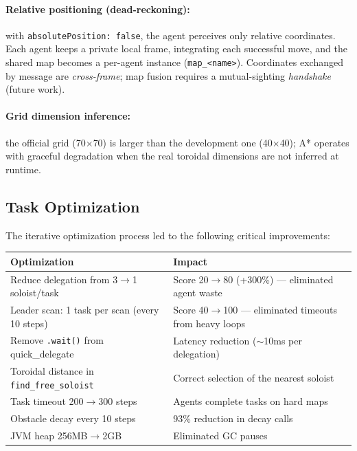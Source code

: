 \documentclass[11pt,a4paper]{article}
\newcommand{\code}[1]{\texttt{#1}}
\begin{document}
\paragraph{Relative positioning (dead-reckoning):} with \code{absolutePosition: false}, the agent perceives only relative coordinates. Each agent keeps a private local frame, integrating each successful move, and the shared map becomes a per-agent instance (\code{map\_<name>}). Coordinates exchanged by message are \emph{cross-frame}; map fusion requires a mutual-sighting \emph{handshake} (future work).

\paragraph{Grid dimension inference:} the official grid (70$\times$70) is larger than the development one (40$\times$40); A* operates with graceful degradation when the real toroidal dimensions are not inferred at runtime.

\subsection{Task Optimization}
The iterative optimization process led to the following critical improvements:

\begin{table}[H]
\centering
\begin{tabularx}{\linewidth}{X X}
\toprule
\textbf{Optimization} & \textbf{Impact} \\
\midrule
Reduce delegation from 3$\rightarrow$1 soloist/task & Score 20$\rightarrow$80 (+300\%) --- eliminated agent waste \\
Leader scan: 1 task per scan (every 10 steps) & Score 40$\rightarrow$100 --- eliminated timeouts from heavy loops \\
Remove \code{.wait()} from quick\_delegate & Latency reduction ($\sim$10ms per delegation) \\
Toroidal distance in \code{find\_free\_soloist} & Correct selection of the nearest soloist \\
Task timeout 200$\rightarrow$300 steps & Agents complete tasks on hard maps \\
Obstacle decay every 10 steps & 93\% reduction in decay calls \\
JVM heap 256MB$\rightarrow$2GB & Eliminated GC pauses \\
\bottomrule
\end{tabularx}
\end{table}
\end{document}
